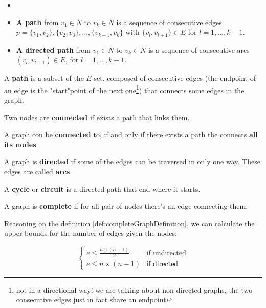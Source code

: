         \begin{definition}[Path]
            \begin{itemize}
                \item[]
                \item[] \textbf{A path} from $v_1 \in N$ to $v_k \in N$ is a sequence of consecutive edges $p =  \{v_1 , v_2 \}, \{v_2 , v_3 \}, . . . , \{v_{k-1} , v_k \}$ with $\{v_l , v_{l+1}\} \in E$ for $l = 1, . . . , k - 1$.
                \item[] \textbf{A directed path} from $v_1 \in N$ to $v_k \in N$ is a sequence of consecutive arcs $(v_l , v_{l+1}) \in E$, for $l = 1, . . . , k - 1$.
            \end{itemize}
        \end{definition}
        A \textbf{path} is a subset of the $E$ set, composed of consecutive edges (the endpoint of an edge is the "start"point of the next one\footnote{not in a directional way! we are talking about non directed graphs, the two consecutive edges just in fact share an endpoint}) that connects some edges in the graph.
        \begin{definition}
            Two nodes are \textbf{connected} if exists a path that links them.
        \end{definition}
        \begin{definition}
            A graph con be \textbf{connected} to, if and only if there exists a path the connects \textbf{all its nodes}.
        \end{definition}
        \begin{definition}
            A graph is \textbf{directed} if some of the edges can be traversed in only one way. These edges are called \textbf{arcs}.
        \end{definition}
        \begin{definition}
            A \textbf{cycle} or \textbf{circuit} is a directed path that end where it starts.
        \end{definition}
        \begin{definition}
            \label{def:completeGraphDefinition}
            A graph is \textbf{complete} if for all pair of nodes there's an edge connecting them.
        \end{definition}
        Reasoning on the definition \ref{def:completeGraphDefinition}, we can calculate the upper bounds for the number of edges given the nodes: 
        \begin{property}\label{pro:number_of_edges}
            \begin{equation}
                \begin{cases}
                    e \leq \frac{n \times (n-1)}{2}  &\text{if undirected} \\
                    e \leq n \times (n-1) &\text{if directed}
                \end{cases}
            \end{equation}
        \end{property}
